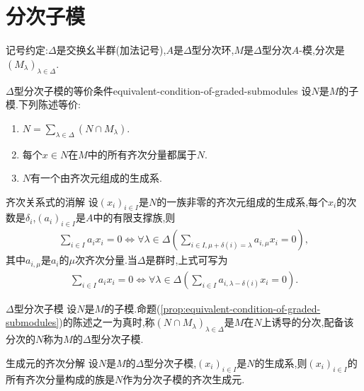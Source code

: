\section{分次子模}

记号约定:$\Delta$是交换幺半群(加法记号),$A$是$\Delta$型分次环,$M$是$\Delta$型分次$A$-模,分次是$\left(M_{\lambda}\right)_{\lambda\in\Delta}$.

\begin{proposition}{$\Delta$型分次子模的等价条件}{equivalent-condition-of-graded-submodules}
	设$N$是$M$的子模.下列陈述等价:
	\begin{enumerate}
		\item $N=\sum\limits_{\lambda\in\Delta}\left(N\cap M_{\lambda}\right)$.
		\item 每个$x\in N$在$M$中的所有齐次分量都属于$N$.
		\item $N$有一个由齐次元组成的生成系.
	\end{enumerate}
\end{proposition}

\begin{remark}{齐次关系式的消解}{}
	设$\left(x_{i}\right)_{i\in I}$是$N$的一族非零的齐次元组成的生成系,每个$x_{i}$的次数是$\delta_{i}$,$\left(a_{i}\right)_{i\in I}$是$A$中的有限支撑族,则
	\begin{align*}
		\sum\limits_{i\in I}a_{i}x_{i}=0\iff\forall\lambda\in\Delta\left(\sum\limits_{i\in I,\mu+\delta\left(i\right)=\lambda}a_{i,\mu}x_{i}=0\right),
	\end{align*}
	其中$a_{i,\mu}$是$a_{i}$的$\mu$次齐次分量.当$\Delta$是群时,上式可写为
	\begin{align*}
		\sum\limits_{i\in I}a_{i}x_{i}=0\iff\forall\lambda\in\Delta\left(\sum\limits_{i\in I}a_{i,\lambda-\delta\left(i\right)}x_{i}=0\right).
	\end{align*}
\end{remark}

\begin{definition}{$\Delta$型分次子模}{}
	设$N$是$M$的子模.命题(\cref{prop:equivalent-condition-of-graded-submodules})的陈述之一为真时,称$\left(N\cap M_{\lambda}\right)_{\lambda\in\Delta}$是$M$在$N$上诱导的分次,配备该分次的$N$称为$M$的$\Delta$型分次子模.
\end{definition}

\begin{corollary}{生成元的齐次分解}{}
	设$N$是$M$的$\Delta$型分次子模,$\left(x_{i}\right)_{i\in I}$是$N$的生成系,则$\left(x_{i}\right)_{i\in I}$的所有齐次分量构成的族是$N$作为分次子模的齐次生成元.
\end{corollary}

